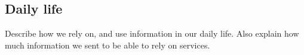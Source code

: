 \subsection{Daily life}
Describe how we rely on, and use information in our daily life. Also explain how much information we sent to be able to rely on services.

